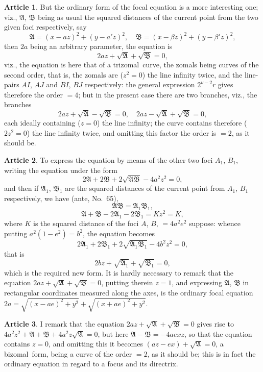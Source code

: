 \documentclass[11pt,a4paper]{article}
\theoremstyle{definition}
\newtheorem{art}{Article}
\newcommand{\bizomal}{bizomal}
\newcommand{\trizomal}{trizomal}
\begin{document}
\begin{art}
But the ordinary form of the focal equation is a more interesting one; viz., $\mathfrak{A}$, $\mathfrak{B}$ being as usual the squared distances of the current point from the two given foci respectively, say
\[
\mathfrak{A} = (x - az)^{2} + (y - a'z)^{2}, \quad \mathfrak{B} = (x - \beta z)^{2} + (y - \beta' z)^{2},
\]
then $2a$ being an arbitrary parameter, the equation is
\[
2az + \sqrt{\mathfrak{A}} + \sqrt{\mathfrak{B}} = 0,
\]
viz., the equation is here that of a \trizomal\ curve, the zomals being curves of the second order, that is, the zomals are ($z^{2} = 0$) the line infinity twice, and the line-pairs $AI$, $AJ$ and $BI$, $BJ$ respectively: the general expression $2^{\nu-2}r$ gives therefore the order $= 4$; but in the present case there are two branches, viz., the branches
\[
2az + \sqrt{\mathfrak{A}} - \sqrt{\mathfrak{B}} = 0, \quad 2az - \sqrt{\mathfrak{A}} + \sqrt{\mathfrak{B}} = 0,
\]
each ideally containing ($z = 0$) the line infinity; the curve contains therefore ($2z^{2} = 0$) the line infinity twice, and omitting this factor the order is $= 2$, as it should be.
\end{art}

\begin{art}
To express the equation by means of the other two foci $A_{1}$, $B_{1}$, writing the equation under the form
\[
2\mathfrak{A} + 2\mathfrak{B} + 2\sqrt{\mathfrak{A}\mathfrak{B}} - 4a^{2}z^{2} = 0,
\]
and then if $\mathfrak{A}_{1}$, $\mathfrak{B}_{1}$ are the squared distances of the current point from $A_{1}$, $B_{1}$ respectively, we have (ante, No.\ 65),
\[
\mathfrak{A}\mathfrak{B} = \mathfrak{A}_{1}\mathfrak{B}_{1},
\]
\[
\mathfrak{A} + \mathfrak{B} - 2\mathfrak{A}_{1} - 2\mathfrak{B}_{1} = Kz^{2} = K,
\]
where $K$ is the squared distance of the foci $A$, $B$, $= 4a^{2}e^{2}$ suppose: whence putting $a^{2}(1 - e^{2}) = b^{2}$, the equation becomes
\[
2\mathfrak{A}_{1} + 2\mathfrak{B}_{1} + 2\sqrt{\mathfrak{A}_{1}\mathfrak{B}_{1}} - 4b^{2}z^{2} = 0,
\]
that is
\[
2bz + \sqrt{\mathfrak{A}_{1}} + \sqrt{\mathfrak{B}_{1}} = 0,
\]
which is the required new form. It is hardly necessary to remark that the equation $2az + \sqrt{\mathfrak{A}} + \sqrt{\mathfrak{B}} = 0$, putting therein $z = 1$, and expressing $\mathfrak{A}$, $\mathfrak{B}$ in rectangular coordinates measured along the axes, is the ordinary focal equation $2a = \sqrt{(x - ae)^{2} + y^{2}} + \sqrt{(x + ae)^{2} + y^{2}}$.
\end{art}

\begin{art}
I remark that the equation $2az + \sqrt{\mathfrak{A}} + \sqrt{\mathfrak{B}} = 0$ gives rise to $4a^{2}z^{2} + \mathfrak{A} + \mathfrak{B} + 4a^{2}z\sqrt{\mathfrak{A}} = 0$, but here $\mathfrak{A} - \mathfrak{B} = -4aexz$, so that the equation contains $z = 0$, and omitting this it becomes $(az - ex) + \sqrt{\mathfrak{A}} = 0$, a \bizomal\ form, being a curve of the order $= 2$, as it should be; this is in fact the ordinary equation in regard to a focus and its directrix.
\end{art}
\end{document}
